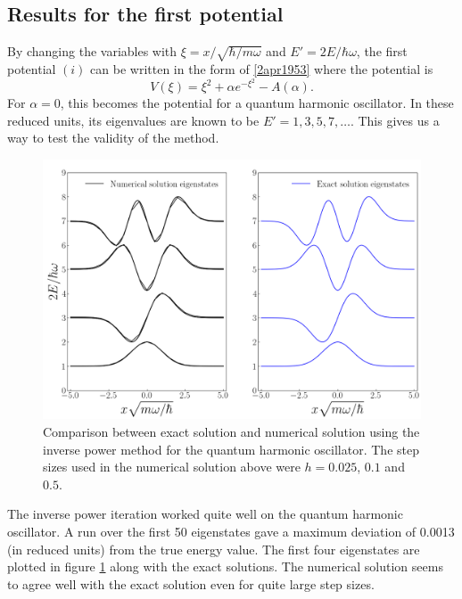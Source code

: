 \documentclass[twocolumn]{article}
\begin{document}
\begin{large}
\subsection*{Results for the first potential}
By changing the variables with $\xi = x/\sqrt{\hbar/m\omega}$ and $E' = 2E/\hbar\omega$, the first potential $(i)$ can be written in the form of \eqref{2apr1953} where the potential is  
\begin{equation}
    \label{29mar1748}
    V(\xi) = \xi^2+\alpha e^{-\xi^2} - A(\alpha).
\end{equation}
For $\alpha=0$, this becomes the potential for a quantum harmonic oscillator. In these reduced units, its eigenvalues are known to be $E'=1,3,5,7,\dots$. This gives us a way to test the validity of the method.
\begin{figure}[b!]
    \centering
    \includegraphics[scale=0.28]{comparison.png}
    \caption{Comparison between exact solution and numerical solution using the inverse power method for the quantum harmonic oscillator. The step sizes used in the numerical solution above were $h=0.025$, $0.1$ and $0.5$.}
    \label{2apr2208}
\end{figure}
The inverse power iteration worked quite well on the quantum harmonic oscillator. A run over the first 50 eigenstates gave a maximum deviation of 0.0013 (in reduced units) from the true energy value. The first four eigenstates are plotted in figure \ref{2apr2208} along with the exact solutions. The numerical solution seems to agree well with the exact solution even for quite large step sizes. 




\end{large}
\end{document}

